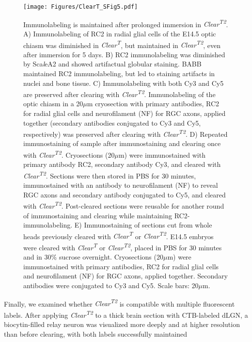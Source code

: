 \begin{figure}[hbtp]
    \begin{center}
        \texttt{[image: Figures/ClearT\_SFig5.pdf]}
        \caption[Immunolabeling is maintained after prolonged immersion in \emph{Clear\textsuperscript{T2}}.]
        {Immunolabeling is maintained after prolonged immersion in \emph{Clear\textsuperscript{T2}}.
        A) Immunolabeling of RC2 in radial glial cells of the E14.5 optic chiasm was diminished in \emph{Clear\textsuperscript{T}}, but maintained in \emph{Clear\textsuperscript{T2}}, even after immersion for 5 days.
        B) RC2 immunolabeling was diminished by Sca\emph{l}eA2 and showed artifactual globular staining.
        BABB maintained RC2 immunolabeling, but led to staining artifacts in nuclei and bone tissue.
        C) Immunolabeling with both Cy3 and Cy5 are preserved after clearing with \emph{Clear\textsuperscript{T2}}.
        Immunolabeling of the optic chiasm in a 20$\mu$m cryosection with primary antibodies, RC2 for radial glial cells
and neurofilament (NF) for RGC axons, applied together (secondary antibodies conjugated to Cy3 and Cy5, respectively) was
preserved after clearing with \emph{Clear\textsuperscript{T2}}.
        D) Repeated immunostaining of sample after immunostaining and clearing once with \emph{Clear\textsuperscript{T2}}.
        Cryosections (20$\mu$m) were immunostained with primary antibody RC2, secondary antibody Cy3, and cleared with \emph{Clear\textsuperscript{T2}}.
        Sections were then stored in PBS for 30 minutes, immunostained with an antibody to neurofilament (NF) to reveal RGC axons and secondary antibody conjugated to Cy5, and cleared with \emph{Clear\textsuperscript{T2}}.
        Post-cleared sections were reusable for another round of immunostaining and clearing while maintaining RC2-immunolabeling.
        E) Immunostaining of sections cut from whole heads previously cleared with \emph{Clear\textsuperscript{T}} or \emph{Clear\textsuperscript{T2}}.
        E14.5 embryos were cleared with \emph{Clear\textsuperscript{T}} or \emph{Clear\textsuperscript{T2}}, placed in PBS for 30 minutes and in 30\% sucrose overnight.
        Cryosections (20$\mu$m) were immunostained with primary antibodies, RC2 for radial glial cells and neurofilament (NF) for RGC axons, applied together.
        Secondary antibodies were conjugated to Cy3 and Cy5.
        Scale bars: 20$\mu$m.
        }
        \label{ClearTSFig5}
    \end{center}
\end{figure}

Finally, we examined whether \emph{Clear\textsuperscript{T2}} is compatible with multiple fluorescent labels.
After applying \emph{Clear\textsuperscript{T2}} to a thick brain section with CTB-labeled dLGN, a biocytin-filled relay neuron was visualized more deeply and at higher resolution than before clearing, with both labels successfully maintained %
